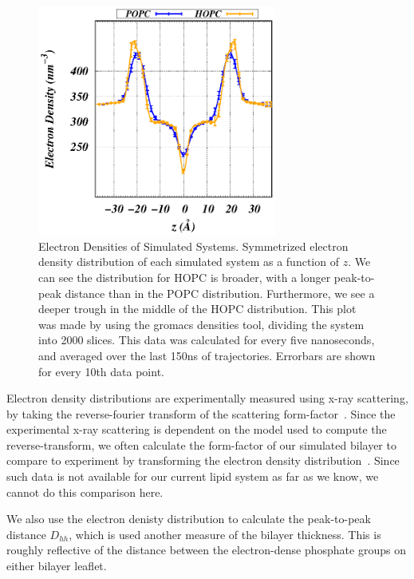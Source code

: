 \documentclass[12pt,openany,final]{book}
\begin{document}
\begin{figure}[p]
    \caption[Electron Densities of Simulated Systems.]{ 
Electron Densities of Simulated Systems. Symmetrized electron density distribution of each simulated system as a 
function of $z$. We can see the distribution for HOPC 
is broader, with a longer peak-to-peak distance than in the POPC distribution. Furthermore, 
we see a deeper trough in the middle of the HOPC distribution. This plot was made by using the gromacs densities tool, 
dividing the system into 2000 slices. This data was calculated for every five 
nanoseconds, and averaged over the last 150ns of trajectories. Errorbars are shown for every 10th data point.
}
\label{fig:eledens}
\includegraphics[width=	0.7\textwidth]{ele_scattering_density.eps}
\end{figure}
Electron density distributions are experimentally measured using x-ray scattering, by taking the reverse-fourier transform of
the scattering form-factor~\cite{fogarty:2015,nagle:2000,pandit:2008:simulationtextbook}. Since the experimental x-ray scattering is dependent on the model used to
compute the reverse-transform, we often calculate the form-factor of our simulated bilayer to compare to experiment by transforming the
electron density distribution~\cite{chiu:2009,kruczek:2017:ether,kruczek:2017}.
Since such data is not available for our current lipid system as far as we know, we cannot do this comparison here. 

We also use the electron denisty distribution to calculate the peak-to-peak distance $D_{hh}$, 
which is used another measure of the bilayer thickness. This is roughly reflective of the distance between the 
electron-dense phosphate groups on either bilayer leaflet.
\end{document}

